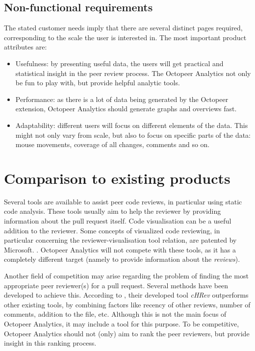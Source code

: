 \documentclass{article}
\begin{document}
\subsection{Non-functional requirements} \label{section:nonfunctionalrequirements}

The stated customer needs imply that there are several distinct pages required, corresponding to the scale the user is interested in. The most important product attributes are:
\begin{itemize}
\item Usefulness: by presenting useful data, the users will get practical and statistical insight in the peer review process. The Octopeer Analytics not only be fun to play with, but provide helpful analytic tools.
\item Performance: as there is a lot of data being generated by the Octopeer extension, Octopeer Analytics should generate graphs and overviews fast.
\item Adaptability: different users will focus on different elements of the data. This might not only vary from scale, but also to focus on specific parts of the data: mouse movements, coverage of all changes, comments and so on.
\end{itemize}

\section{Comparison to existing products} \label{section:comparisontoexistingproducts}
Several tools are available to assist peer code reviews, in particular using static code analysis. \parencite{reviewtools} These tools usually aim to help the reviewer by providing information about the pull request itself. Code visualisation can be a useful addition to the reviewer. Some concepts of visualized code reviewing, in particular concerning the reviewer-visualisation tool relation, are patented by Microsoft. \parencite{wang2015visualized}. Octopeer Analytics will not compete with these tools, as it has a completely different target (namely to provide information about the \textit{reviews}).

Another field of competition may arise regarding the problem of finding the most appropriate peer reviewer(s) for a pull request. Several methods have been developed to achieve this. According to  \cite{automaticallyrecommending}, their developed tool \textit{cHRev} outperforms other existing tools, by combining factors like recency of other reviews, number of comments, addition to the file, etc. Although this is not the main focus of Octopeer Analytics, it may include a tool for this purpose. To be competitive, Octopeer Analytics should not (only) aim to rank the peer reviewers, but provide insight in this ranking process.
\end{document}
